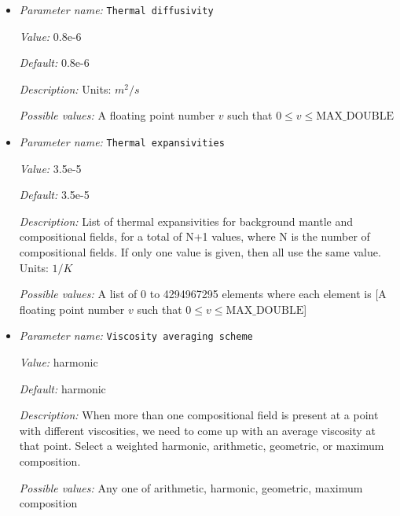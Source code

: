 \begin{itemize}
{\it Default:} 3.5


{\it Description:} List of stress exponents, $n_{\text{dislocation}}$, for background mantle and compositional fields, for a total of N+1 values, where N is the number of compositional fields. If only one value is given, then all use the same value.  Units: None


{\it Possible values:} A list of 0 to 4294967295 elements where each element is [A floating point number $v$ such that $0 \leq v \leq \text{MAX\_DOUBLE}$]
\item {\it Parameter name:} {\tt Thermal diffusivity}
\label{parameters:Material model/Diffusion dislocation/Thermal diffusivity}
\label{parameters:Material_20model/Diffusion_20dislocation/Thermal_20diffusivity}


{\it Value:} 0.8e-6


{\it Default:} 0.8e-6


{\it Description:} Units: $m^2/s$


{\it Possible values:} A floating point number $v$ such that $0 \leq v \leq \text{MAX\_DOUBLE}$
\item {\it Parameter name:} {\tt Thermal expansivities}
\label{parameters:Material model/Diffusion dislocation/Thermal expansivities}
\label{parameters:Material_20model/Diffusion_20dislocation/Thermal_20expansivities}


{\it Value:} 3.5e-5


{\it Default:} 3.5e-5


{\it Description:} List of thermal expansivities for background mantle and compositional fields, for a total of N+1 values, where N is the number of compositional fields. If only one value is given, then all use the same value.  Units: $1 / K$


{\it Possible values:} A list of 0 to 4294967295 elements where each element is [A floating point number $v$ such that $0 \leq v \leq \text{MAX\_DOUBLE}$]
\item {\it Parameter name:} {\tt Viscosity averaging scheme}
\label{parameters:Material model/Diffusion dislocation/Viscosity averaging scheme}
\label{parameters:Material_20model/Diffusion_20dislocation/Viscosity_20averaging_20scheme}


{\it Value:} harmonic


{\it Default:} harmonic


{\it Description:} When more than one compositional field is present at a point with different viscosities, we need to come up with an average viscosity at that point.  Select a weighted harmonic, arithmetic, geometric, or maximum composition.


{\it Possible values:} Any one of arithmetic, harmonic, geometric, maximum composition
\end{itemize}

